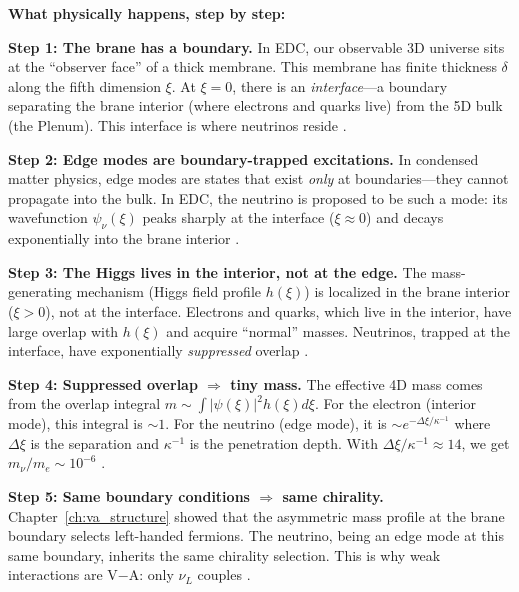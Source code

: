 
\begin{tcolorbox}[colback=green!5!white, colframe=green!50!black,
    title=\textbf{Physical Process Narrative: How Neutrinos Become ``Ghostly''}]
\textbf{What physically happens, step by step:}

\textbf{Step 1: The brane has a boundary.}
In EDC, our observable 3D universe sits at the ``observer face'' of a thick membrane.
This membrane has finite thickness $\delta$ along the fifth dimension $\xi$. At $\xi = 0$,
there is an \emph{interface}---a boundary separating the brane interior (where electrons
and quarks live) from the 5D bulk (the Plenum). This interface is where neutrinos
reside \tagP{}.

\textbf{Step 2: Edge modes are boundary-trapped excitations.}
In condensed matter physics, edge modes are states that exist \emph{only} at boundaries---they
cannot propagate into the bulk. In EDC, the neutrino is proposed to be such a mode:
its wavefunction $\psi_\nu(\xi)$ peaks sharply at the interface ($\xi \approx 0$) and
decays exponentially into the brane interior \tagP{}.

\textbf{Step 3: The Higgs lives in the interior, not at the edge.}
The mass-generating mechanism (Higgs field profile $h(\xi)$) is localized in the brane
interior ($\xi > 0$), not at the interface. Electrons and quarks, which live in the
interior, have large overlap with $h(\xi)$ and acquire ``normal'' masses. Neutrinos,
trapped at the interface, have exponentially \emph{suppressed} overlap \tagDc{}.

\textbf{Step 4: Suppressed overlap $\Rightarrow$ tiny mass.}
The effective 4D mass comes from the overlap integral $m \sim \int |\psi(\xi)|^2 h(\xi) d\xi$.
For the electron (interior mode), this integral is $\sim 1$. For the neutrino (edge mode),
it is $\sim e^{-\Delta\xi/\kappa^{-1}}$ where $\Delta\xi$ is the separation and $\kappa^{-1}$
is the penetration depth. With $\Delta\xi/\kappa^{-1} \approx 14$, we get $m_\nu/m_e \sim 10^{-6}$
\tagDc{}.

\textbf{Step 5: Same boundary conditions $\Rightarrow$ same chirality.}
Chapter~\ref{ch:va_structure} showed that the asymmetric mass profile at the brane
boundary selects left-handed fermions. The neutrino, being an edge mode at this same
boundary, inherits the same chirality selection. This is why weak interactions are
V$-$A: only $\nu_L$ couples \tagDc{}.


\end{tcolorbox}
